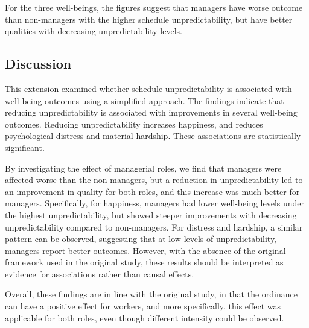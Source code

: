 \documentclass{article}
\begin{document}
	For the three well-beings, the figures suggest that managers have worse outcome than non-managers with the higher schedule unpredictability, but have better qualities with decreasing unpredictability levels. 
	
	\subsection{Discussion}
	
	This extension examined whether schedule unpredictability is associated with well-being outcomes using a simplified approach. The findings indicate that reducing unpredictability is associated with improvements in several well-being outcomes. Reducing unpredictability increases happiness, and reduces psychological distress and material hardship. These associations are statistically significant.
	
	By investigating the effect of managerial roles, we find that managers were affected worse than the non-managers, but a reduction in unpredictability led to an improvement in quality for both roles, and this increase was much better for managers. Specifically, for happiness, managers had lower well-being levels under the highest unpredictability, but showed steeper improvements with decreasing unpredictability compared to non-managers. For distress and hardship, a similar pattern can be observed, suggesting that at low levels of unpredictability, managers report better outcomes. However, with the absence of the original framework used in the original study, these results should be interpreted as evidence for associations rather than causal effects.
	
	Overall, these findings are in line with the original study, in that the ordinance can have a positive effect for workers, and more specifically, this effect was applicable for both roles, even though different intensity could be observed.

	
	
	
	
\end{document}
